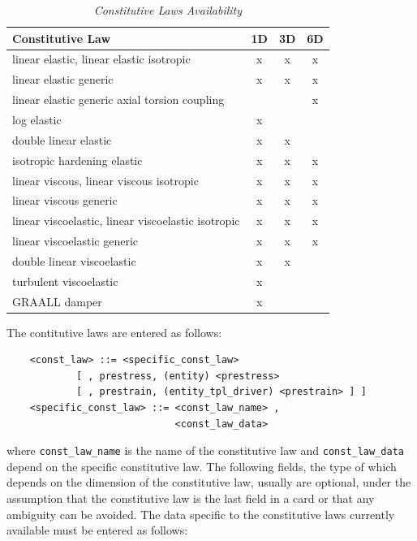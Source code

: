 \documentclass[10pt,dvips]{report}
\begin{document}
\begin{table}[h]
    \newlength{\constlawwidth}
    \setlength{\constlawwidth}{70mm}
    \centering
    \caption{\em Constitutive Laws Availability}\label{tab:CONST-LAW-DIM}
    \begin{tabular}{l|c|c|c} 
        \hline
        Constitutive Law & 1D & 3D & 6D \\ 
	\hline
	linear elastic,  linear elastic isotropic              & x & x & x \\
	linear elastic generic                                 & x & x & x \\
	linear elastic generic axial torsion coupling          &   &   & x \\
	log elastic                                            & x &   &   \\
	double linear elastic                                  & x & x &   \\
	isotropic hardening elastic                            & x & x & x \\
	linear viscous, linear viscous isotropic               & x & x & x \\
	linear viscous generic                                 & x & x & x \\
	linear viscoelastic, linear viscoelastic isotropic     & x & x & x \\
	linear viscoelastic generic                            & x & x & x \\
	double linear viscoelastic                             & x & x &   \\
	turbulent viscoelastic                                 & x &   &   \\
	GRAALL damper                                          & x &   &   \\
	\hline
    \end{tabular}
\end{table}

\noindent 
The contitutive laws are entered as follows:
\begin{verbatim}
    <const_law> ::= <specific_const_law>                        
            [ , prestress, (entity) <prestress>
            [ , prestrain, (entity_tpl_driver) <prestrain> ] ]
    <specific_const_law> ::= <const_law_name> , 
                             <const_law_data>
\end{verbatim}
where {\tt const\_law\_name} is the name of the constitutive law and
{\tt const\_law\_data} depend on the specific constitutive law. 
The following fields, the type of which depends on the dimension of the
constitutive law, usually are optional, under the assumption that the
constitutive law is the last field in a card or that any ambiguity can be
avoided.
The data specific to the constitutive laws currently available must be
entered as follows:
\end{document}
